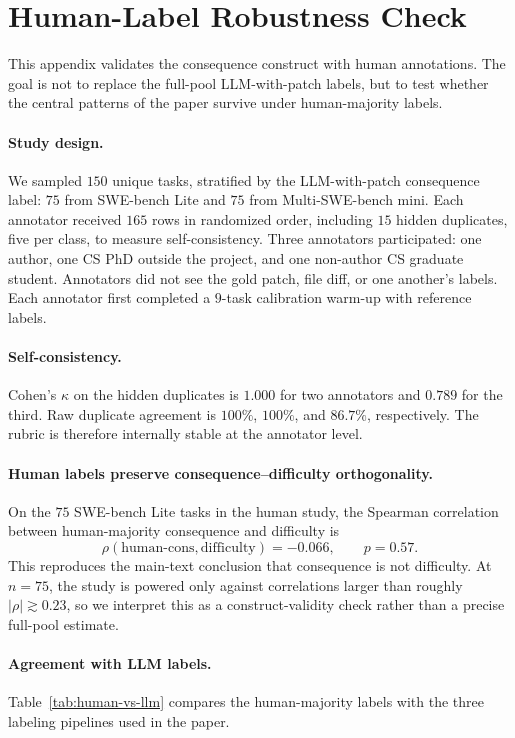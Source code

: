 \documentclass{article}
\begin{document}
\section{Human-Label Robustness Check}
\label{app:iaa}

This appendix validates the consequence construct with human
annotations. The goal is not to replace the full-pool LLM-with-patch
labels, but to test whether the central patterns of the paper survive
under human-majority labels.

\paragraph{Study design.}
We sampled $150$ unique tasks, stratified by the LLM-with-patch
consequence label: $75$ from SWE-bench Lite and $75$ from
Multi-SWE-bench mini. Each annotator received $165$ rows in randomized
order, including $15$ hidden duplicates, five per class, to measure
self-consistency. Three annotators participated: one author, one CS PhD
outside the project, and one non-author CS graduate student. Annotators
did not see the gold patch, file diff, or one another's labels. Each
annotator first completed a $9$-task calibration warm-up with reference
labels.

\paragraph{Self-consistency.}
Cohen's $\kappa$ on the hidden duplicates is $1.000$ for two
annotators and $0.789$ for the third. Raw duplicate agreement is
$100\%$, $100\%$, and $86.7\%$, respectively. The rubric is therefore
internally stable at the annotator level.

\paragraph{Human labels preserve consequence--difficulty orthogonality.}
On the $75$ SWE-bench Lite tasks in the human study, the Spearman
correlation between human-majority consequence and difficulty is
\[
\rho(\mathrm{human\mbox{-}cons},\mathrm{difficulty})=-0.066,
\qquad p=0.57.
\]
This reproduces the main-text conclusion that consequence is not
difficulty. At $n=75$, the study is powered only against correlations
larger than roughly $|\rho|\gtrsim 0.23$, so we interpret this as a
construct-validity check rather than a precise full-pool estimate.

\paragraph{Agreement with LLM labels.}
Table~\ref{tab:human-vs-llm} compares the human-majority labels with
the three labeling pipelines used in the paper.
\end{document}
